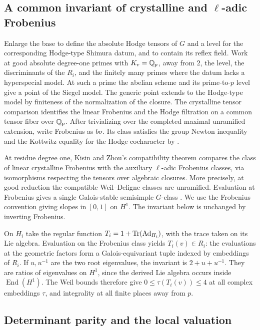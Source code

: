 \subsection{A common invariant of crystalline and \texorpdfstring{\(\ell\)}{l}-adic Frobenius}

Enlarge the base to define the absolute Hodge tensors of \(G\) and a
level for the corresponding Hodge-type Shimura datum, and to contain
its reflex field. Work at good
absolute degree-one primes with \(K_v=\mathbb Q_p\), away from \(2\), the level,
the discriminants of the \(R_i\), and the finitely many primes where
the datum lacks a hyperspecial model. At such a prime the abelian
scheme and its prime-to-\(p\) level give a point of the Siegel model.
The generic point extends to the Hodge-type model by finiteness of
the normalization of the closure. The crystalline tensor comparison
identifies the linear Frobenius and the Hodge filtration on a common
tensor fiber over \(\mathbb Q_p\). After trivializing over the completed
maximal unramified extension, write Frobenius as \(b\sigma\). Its class
satisfies the group Newton inequality and the Kottwitz equality for
the Hodge cocharacter by \cite[\S1.3 and Lemma~1.3.8]{kmps}.

At residue degree one, Kisin and Zhou's compatibility theorem
compares the class of linear crystalline Frobenius with the auxiliary
\(\ell\)-adic Frobenius classes, via isomorphisms respecting the
tensors over algebraic closures. More precisely, at good reduction
the compatible Weil--Deligne classes are unramified. Evaluation at
Frobenius gives a single Galois-stable semisimple \(G\)-class
\cite[\S5.3.3--5.3.4 and Theorem~5.3.10]{kzsemistable}. We use the
Frobenius convention giving slopes in \([0,1]\) on \(H^1\). The
invariant below is unchanged by inverting Frobenius.

On \(H_i\) take the regular function
\(T_i=1+\operatorname{Tr}(\operatorname{Ad}_{H_i})\), with the trace taken on its Lie
algebra. Evaluation on the Frobenius class yields \(T_i(v)\in R_i\):
the evaluations at the geometric factors form a Galois-equivariant
tuple indexed by embeddings of \(R_i\). If \(u,u^{-1}\) are the two
root eigenvalues, the invariant is \(2+u+u^{-1}\). They are ratios of
eigenvalues on \(H^1\), since the derived Lie algebra occurs inside
\(\operatorname{End}(H^1)\). The Weil bounds therefore give
\(0\le \tau(T_i(v))\le 4\) at all complex embeddings \(\tau\), and
integrality at all finite places away from \(p\).

\subsection{Determinant parity and the local valuation}

